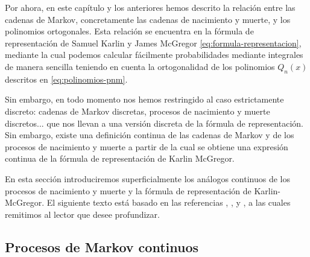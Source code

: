     Por ahora, en este capítulo y los anteriores hemos descrito la relación entre las cadenas de Markov, concretamente las cadenas de nacimiento y muerte, y los polinomios ortogonales. Esta relación se encuentra en la fórmula de representación de Samuel Karlin y James McGregor \eqref{eq:formula-representacion}, mediante la cual podemos calcular fácilmente probabilidades mediante integrales de manera sencilla teniendo en cuenta la ortogonalidad de los polinomios $Q_n(x)$ descritos en \eqref{eq:polinomios-pnm}.

    Sin embargo, en todo momento nos hemos restringido al caso estrictamente discreto: cadenas de Markov discretas, procesos de nacimiento y muerte discretos... que nos llevan a una versión discreta de la fórmula de representación. Sin embargo, existe una definición continua de las cadenas de Markov y de los procesos de nacimiento y muerte a partir de la cual se obtiene una expresión continua de la fórmula de representación de Karlin McGregor.

    En esta sección introduciremos superficialmente los análogos continuos de los procesos de nacimiento y muerte y la fórmula de representación de Karlin-McGregor. El siguiente texto está basado en las referencias \cite{Anderson}, \cite[Ch. II, III]{schoutens-2000}, \cite{differential-equations} y \cite[Ch. III, Sections 3.1, 3.2]{Manuel}, a las cuales remitimos al lector que desee profundizar.

    \subsection{Procesos de Markov continuos}

